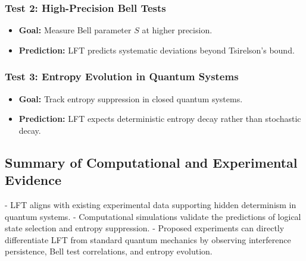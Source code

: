\subsubsection{Test 2: High-Precision Bell Tests}
\begin{itemize}
    \item \textbf{Goal:} Measure Bell parameter \( S \) at higher precision.
    \item \textbf{Prediction:} LFT predicts systematic deviations beyond Tsirelson’s bound.
\end{itemize}







\subsubsection{Test 3: Entropy Evolution in Quantum Systems}
\begin{itemize}
    \item \textbf{Goal:} Track entropy suppression in closed quantum systems.
    \item \textbf{Prediction:} LFT expects deterministic entropy decay rather than stochastic decay.
\end{itemize}

\subsection{Summary of Computational and Experimental Evidence}
- LFT aligns with existing experimental data supporting hidden determinism in quantum systems.
- Computational simulations validate the predictions of logical state selection and entropy suppression.
- Proposed experiments can directly differentiate LFT from standard quantum mechanics by observing interference persistence, Bell test correlations, and entropy evolution.